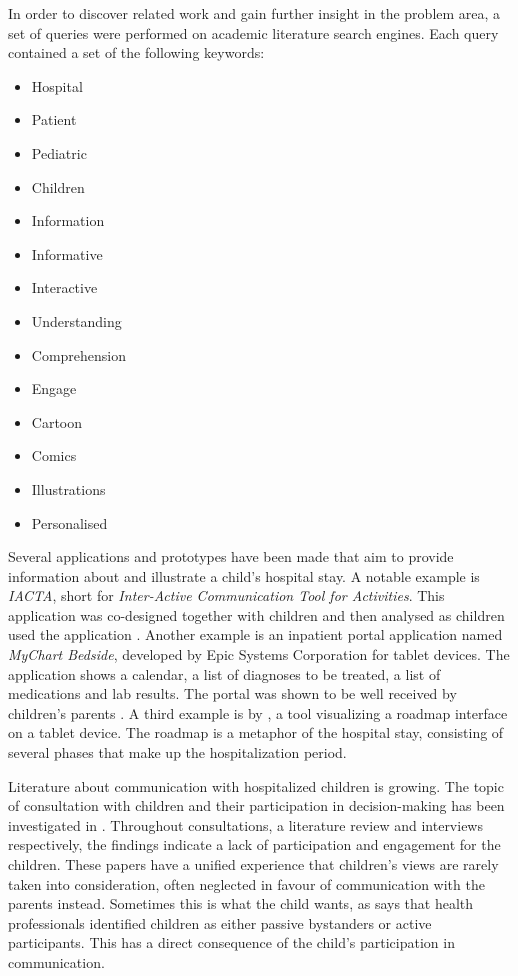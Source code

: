 In order to discover related work and gain further insight in the problem area, a set of queries were performed on academic literature search engines. Each query contained a set of the following keywords:

\begin{multicols}{3}
    \raggedcolumns
    \begin{itemize}
        \item Hospital
        \item Patient
        \item Pediatric
        \item Children
        \item Information
        \item Informative
        \item Interactive
        \item Understanding
        \item Comprehension
        \item Engage
        \item Cartoon
        \item Comics
        \item Illustrations
        \item Personalised
    \end{itemize}
\end{multicols}


Several applications and prototypes have been made that aim to provide information about and illustrate a child's hospital stay. A notable example is \emph{IACTA}, short for \emph{Inter-Active Communication Tool for Activities}. This application was co-designed together with children \parencite{stalberg2016} and then analysed as children used the application \parencite{stalberg2018}. Another example is an inpatient portal application named \emph{MyChart Bedside}, developed by Epic Systems Corporation for tablet devices. The application shows a calendar, a list of diagnoses to be treated, a list of medications and lab results. The portal was shown to be well received by children's parents \textcite{kelly2017}. A third example is by \textcite{maher2016}, a tool visualizing a roadmap interface on a tablet device. The roadmap is a metaphor of the hospital stay, consisting of several phases that make up the hospitalization period.

Literature about communication with hospitalized children is growing. The topic of consultation with children and their participation in decision-making has been investigated in \textcite{coyne2006,coyne2008,coyne2011}. Throughout consultations, a literature review and interviews respectively, the findings indicate a lack of participation and engagement for the children. These papers have a unified experience that children's views are rarely taken into consideration, often neglected in favour of communication with the parents instead. Sometimes this is what the child wants, as \textcite{lambert2011} says that health professionals identified children as either passive bystanders or active participants. This has a direct consequence of the child's participation in communication.

